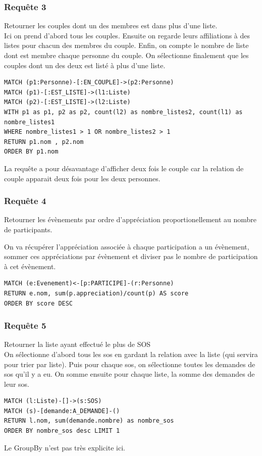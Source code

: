 \documentclass[a4paper,oneside,1pt]{article}
\begin{document}
\subsubsection{Requête 3}
Retourner les couples dont un des membres est dans plus d'une liste.
\\
Ici on prend d'abord tous les couples. Ensuite on regarde leurs affiliations à des listes pour chacun des membres du couple. Enfin, on compte le nombre de liste dont est membre chaque personne du couple. On sélectionne finalement que les couples dont un des deux est listé à plus d'une liste.
\\
\begin{verbatim}
MATCH (p1:Personne)-[:EN_COUPLE]->(p2:Personne)
MATCH (p1)-[:EST_LISTE]->(l1:Liste)
MATCH (p2)-[:EST_LISTE]->(l2:Liste)
WITH p1 as p1, p2 as p2, count(l2) as nombre_listes2, count(l1) as nombre_listes1
WHERE nombre_listes1 > 1 OR nombre_listes2 > 1 
RETURN p1.nom , p2.nom
ORDER BY p1.nom
\end{verbatim} 

La requête a pour désavantage d'afficher deux fois le couple car la relation de couple apparait deux fois pour les deux personnes.

\subsubsection{Requête 4}
Retourner les évènements par ordre d'appréciation proportionellement au nombre de participants.

On va récupérer l'appréciation associée à chaque participation a un évènement, sommer ces appréciations par évènement et diviser pas le nombre de participation à cet évènement.
\begin{verbatim}
MATCH (e:Evenement)<-[p:PARTICIPE]-(r:Personne)
RETURN e.nom, sum(p.appreciation)/count(p) AS score
ORDER BY score DESC
\end{verbatim}

\subsubsection{Requête 5}
Retourner la liste ayant effectué le plus de SOS
\\
On sélectionne d'abord tous les sos en gardant la relation avec la liste (qui servira pour trier par liste). Puis pour chaque sos, on sélectionne toutes les demandes de sos qu'il y a eu. On somme ensuite pour chaque liste, la somme des demandes de leur sos.
\\
\begin{verbatim}
MATCH (l:Liste)-[]->(s:SOS)
MATCH (s)-[demande:A_DEMANDE]-()
RETURN l.nom, sum(demande.nombre) as nombre_sos
ORDER BY nombre_sos desc LIMIT 1
\end{verbatim}

Le GroupBy n'est pas très explicite ici.
\end{document}
